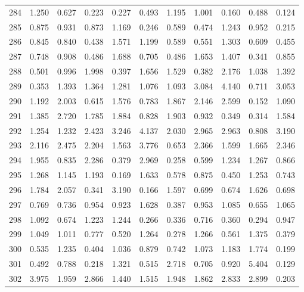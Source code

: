 \begin{tabular}{lrrrrrrrrrr}
284 &  1.250 &  0.627 &  0.223 &  0.227 &  0.493 &  1.195 &  1.001 &  0.160 &  0.488 &  0.124 \\
285 &  0.875 &  0.931 &  0.873 &  1.169 &  0.246 &  0.589 &  0.474 &  1.243 &  0.952 &  0.215 \\
286 &  0.845 &  0.840 &  0.438 &  1.571 &  1.199 &  0.589 &  0.551 &  1.303 &  0.609 &  0.455 \\
287 &  0.748 &  0.908 &  0.486 &  1.688 &  0.705 &  0.486 &  1.653 &  1.407 &  0.341 &  0.855 \\
288 &  0.501 &  0.996 &  1.998 &  0.397 &  1.656 &  1.529 &  0.382 &  2.176 &  1.038 &  1.392 \\
289 &  0.353 &  1.393 &  1.364 &  1.281 &  1.076 &  1.093 &  3.084 &  4.140 &  0.711 &  3.053 \\
290 &  1.192 &  2.003 &  0.615 &  1.576 &  0.783 &  1.867 &  2.146 &  2.599 &  0.152 &  1.090 \\
291 &  1.385 &  2.720 &  1.785 &  1.884 &  0.828 &  1.903 &  0.932 &  0.349 &  0.314 &  1.584 \\
292 &  1.254 &  1.232 &  2.423 &  3.246 &  4.137 &  2.030 &  2.965 &  2.963 &  0.808 &  3.190 \\
293 &  2.116 &  2.475 &  2.204 &  1.563 &  3.776 &  0.653 &  2.366 &  1.599 &  1.665 &  2.346 \\
294 &  1.955 &  0.835 &  2.286 &  0.379 &  2.969 &  0.258 &  0.599 &  1.234 &  1.267 &  0.866 \\
295 &  1.268 &  1.145 &  1.193 &  0.169 &  1.633 &  0.578 &  0.875 &  0.450 &  1.253 &  0.743 \\
296 &  1.784 &  2.057 &  0.341 &  3.190 &  0.166 &  1.597 &  0.699 &  0.674 &  1.626 &  0.698 \\
297 &  0.769 &  0.736 &  0.954 &  0.923 &  1.628 &  0.387 &  0.953 &  1.085 &  0.655 &  1.065 \\
298 &  1.092 &  0.674 &  1.223 &  1.244 &  0.266 &  0.336 &  0.716 &  0.360 &  0.294 &  0.947 \\
299 &  1.049 &  1.011 &  0.777 &  0.520 &  1.264 &  0.278 &  1.266 &  0.561 &  1.375 &  0.379 \\
300 &  0.535 &  1.235 &  0.404 &  1.036 &  0.879 &  0.742 &  1.073 &  1.183 &  1.774 &  0.199 \\
301 &  0.492 &  0.788 &  0.218 &  1.321 &  0.515 &  2.718 &  0.705 &  0.920 &  5.404 &  0.129 \\
302 &  3.975 &  1.959 &  2.866 &  1.440 &  1.515 &  1.948 &  1.862 &  2.833 &  2.899 &  0.203 \\

\end{tabular}

